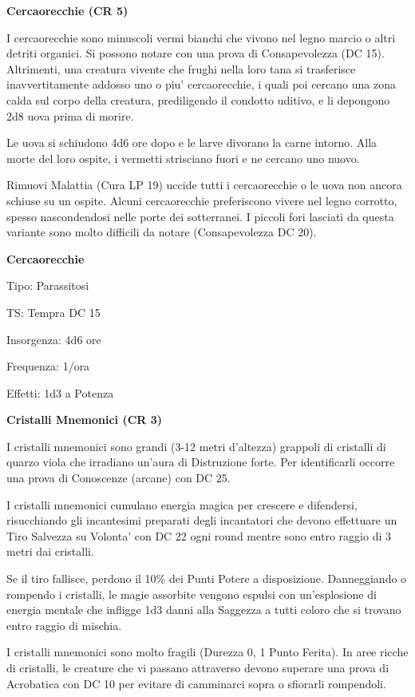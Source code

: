 \documentclass[a4paper,11pt,twoside,openany]{book}
\begin{document}
{\textbf{Cercaorecchie (CR 5)}

I cercaorecchie sono minuscoli vermi bianchi che vivono nel legno marcio o altri detriti organici. Si possono notare con una prova di Consapevolezza (DC 15). Altrimenti, una creatura vivente che frughi nella loro tana si trasferisce inavvertitamente addosso uno o piu' cercaorecchie, i quali poi cercano una zona calda sul corpo della creatura, prediligendo il condotto uditivo, e li depongono 2d8 uova prima di morire. 

Le uova si schiudono 4d6 ore dopo e le larve divorano la carne intorno. Alla morte del loro ospite, i vermetti strisciano fuori e ne cercano uno nuovo.

Rimuovi Malattia (Cura LP 19) uccide tutti i cercaorecchie o le uova non ancora schiuse su un ospite. Alcuni cercaorecchie preferiscono vivere nel legno corrotto, spesso nascondendosi nelle porte dei sotterranei. I piccoli fori lasciati da questa variante sono molto difficili da notare (Consapevolezza DC 20).

\textbf{Cercaorecchie}

Tipo: Parassitosi

TS: Tempra DC 15

Insorgenza: 4d6 ore

Frequenza: 1/ora

Effetti: 1d3 a Potenza

\textbf{Cristalli Mnemonici (CR 3)}

I cristalli mnemonici sono grandi (3-12 metri d'altezza) grappoli di cristalli di quarzo viola che irradiano un'aura di Distruzione forte. Per identificarli occorre una prova di Conoscenze (arcane) con DC 25.

I cristalli mnemonici cumulano energia magica per crescere e difendersi, risucchiando gli incantesimi preparati degli incantatori che devono effettuare un Tiro Salvezza su Volonta' con DC 22 ogni round mentre sono entro raggio di 3 metri dai cristalli.

Se il tiro fallisce, perdono il 10\% dei Punti Potere a disposizione. Danneggiando o rompendo i cristalli, le magie assorbite vengono espulsi con un'esplosione di energia mentale che infligge 1d3 danni alla Saggezza a tutti coloro che si trovano entro raggio di mischia.

I cristalli mnemonici sono molto fragili (Durezza 0, 1 Punto Ferita).
In aree ricche di cristalli, le creature che vi passano attraverso devono superare una prova di Acrobatica con DC 10 per evitare di camminarci sopra o sfiorarli rompendoli.

}
\end{document}
